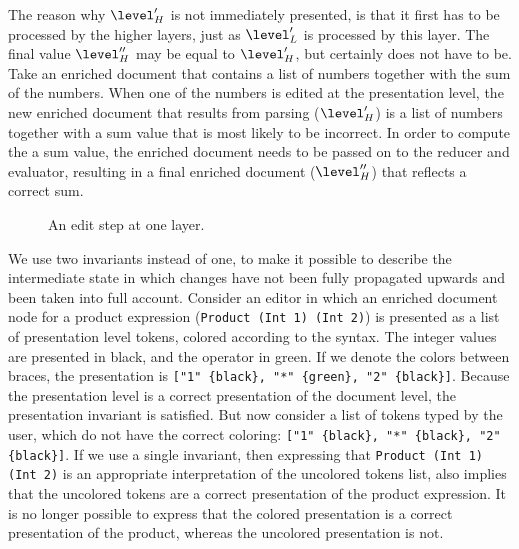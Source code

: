 \bc
The reason why $\level'_{H}$ is not immediately presented, is that it first has to be processed by the higher layers, just as $\level'_{L}$ is processed by this layer. The final value $\level''_{H}$ may be equal to $\level'_{H}$, but certainly does not have to be. Take an enriched document that contains a list of numbers together with the sum of the numbers. When one of the numbers is edited at the presentation level, the new enriched document that results from parsing ($\level'_{H}$) is a list of numbers together with a sum value that is most likely to be incorrect. In order to compute the a sum value, the enriched document needs to be passed on to the reducer and evaluator, resulting in a final enriched document ($\level''_{H}$) that reflects a correct sum.
\ec
\begin{figure}
\begin{small}
\begin{center}
\begin{center}
\end{center}\caption{An edit step at one layer.}\label{layerEditProcess} 
\end{center}
\end{small}
\end{figure}

\bc
We use two invariants instead of one, to make it possible to describe the intermediate state in which changes have not been fully propagated upwards and been taken into full account. Consider an editor in which an enriched document node for a product expression (\verb|Product (Int 1) (Int 2)|) is presented as a list of presentation level tokens, colored according to the syntax. The integer values are presented in black, and the operator in green. If we denote the colors between braces, the presentation is \verb|["1" {black}, "*" {green}, "2" {black}]|. Because the presentation level is a correct presentation of the document level, the presentation invariant is satisfied. But now consider a list of tokens typed by the user, which do not have the correct coloring: \verb|["1" {black}, "*" {black}, "2" {black}]|. If we use a single invariant, then expressing that \verb|Product (Int 1) (Int 2)| is an appropriate interpretation of the uncolored tokens list, also implies that the uncolored tokens are a correct presentation of the product expression. It is no longer possible to express that the colored presentation is a correct presentation of the product, whereas the uncolored presentation is not.  \ec



